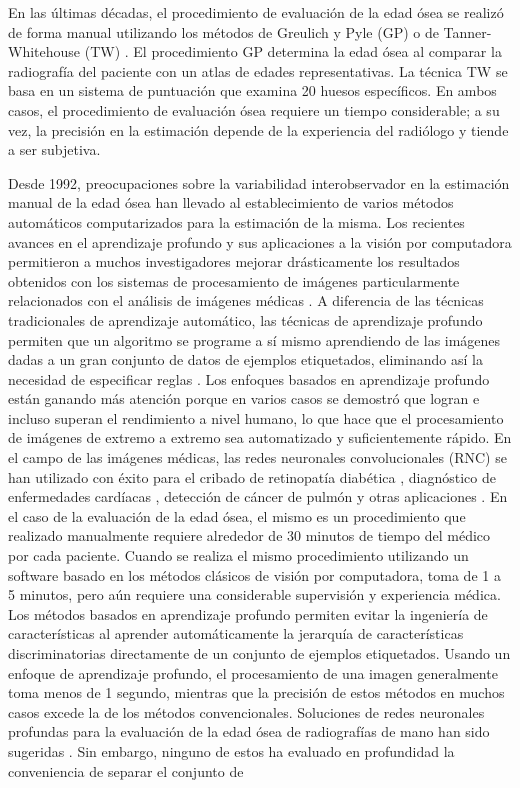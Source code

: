 \documentclass[conference]{IEEEtran}
\begin{document}
En las últimas décadas, el procedimiento de evaluación de la edad ósea se realizó de forma manual utilizando los métodos de Greulich y Pyle (GP) \cite{GP} o de Tanner-Whitehouse (TW) \cite{TW3}. El procedimiento GP determina la edad ósea al comparar la radiografía del paciente con un atlas de edades representativas. La técnica TW se basa en un sistema de puntuación que examina 20 huesos específicos. En ambos casos, el procedimiento de evaluación ósea requiere un tiempo considerable; a su vez, la precisión en la estimación depende de la experiencia del radiólogo y tiende a ser subjetiva. 

Desde 1992, preocupaciones sobre la variabilidad interobservador en la estimación manual de la edad ósea \cite{GP_variability} han llevado al establecimiento de varios métodos automáticos computarizados para la estimación de la misma. Los recientes avances en el aprendizaje profundo y sus aplicaciones a la visión por computadora permitieron a muchos investigadores mejorar drásticamente los resultados obtenidos con los sistemas de procesamiento de imágenes particularmente relacionados con el análisis de imágenes médicas \cite{DeepLearningInBiology}. A diferencia de las técnicas tradicionales de aprendizaje automático, las técnicas de aprendizaje profundo permiten que un algoritmo se programe a sí mismo aprendiendo de las imágenes dadas a un gran conjunto de datos de ejemplos etiquetados, eliminando así la necesidad de especificar reglas \cite{DeepLearning}. Los enfoques basados en aprendizaje profundo están ganando más atención porque en varios casos se demostró que logran e incluso superan el rendimiento a nivel humano, lo que hace que el procesamiento de imágenes de extremo a extremo sea automatizado y suficientemente rápido. En el campo de las imágenes médicas, las redes neuronales convolucionales (RNC) se han utilizado con éxito para el cribado de retinopatía diabética \cite{DeepLearningInDiabetics}, diagnóstico de enfermedades cardíacas \cite{DeepLearningInHeartDiseases}, detección de cáncer de pulmón \cite{DeepLearningLungCancer} y otras aplicaciones \cite{DeepLearningInBiology}. En el caso de la evaluación de la edad ósea, el mismo es un procedimiento que realizado manualmente requiere alrededor de 30 minutos de tiempo del médico por cada paciente. Cuando se realiza el mismo procedimiento utilizando un software basado en los métodos clásicos de visión por computadora, toma de 1 a 5 minutos, pero aún requiere una considerable supervisión y experiencia médica. Los métodos basados en aprendizaje profundo permiten evitar la ingeniería de características al aprender automáticamente la jerarquía de características discriminatorias directamente de un conjunto de ejemplos etiquetados. Usando un enfoque de aprendizaje profundo, el procesamiento de una imagen generalmente toma menos de 1 segundo, mientras que la precisión de estos métodos en muchos casos excede la de los métodos convencionales. Soluciones de redes neuronales profundas para la evaluación de la edad ósea de radiografías de mano han sido sugeridas \cite{DeepLearningAssesingSkeletalMaturity1,DeepLearningAssesingSkeletalMaturity2,DeepLearningAssesingSkeletalMaturity3}. Sin embargo, ninguno de estos ha evaluado en profundidad la conveniencia de separar el conjunto de 
\end{document}
